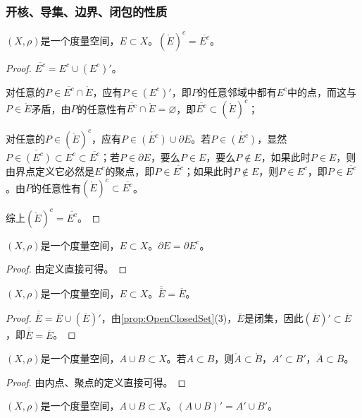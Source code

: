 \subsubsection{开核、导集、边界、闭包的性质}
\begin{theorem}
	$(X,\rho)$是一个度量空间，$E\subset X$。$(\mathring{E})^c=\overline{E^c}$。
\end{theorem}
\begin{proof}
	$\overline{E^c}=E^c\cup (E^c)'$。\par
	对任意的$ P\in\overline{E^c}\cap\mathring{E}$，应有$P\in(E^c)'$，即$P$的任意邻域中都有$E^c$中的点，而这与$P\in\mathring{E}$矛盾，由$P$的任意性有$\overline{E^c}\cap\mathring{E}=\varnothing$，即$\overline{E^c}\subset(\mathring{E})^c$；\par
	对任意的$ P\in(\mathring{E})^c$，应有$P\in\mathring{(E^c)}\cup\partial E$。若$P\in\mathring{(E^c)}$，显然$P\in\mathring{(E^c)}\subset E^c\subset\overline{E^c}$；若$P\in\partial E$，要么$P\in E$，要么$P\notin E$，如果此时$P\in E$，则由界点定义它必然是$E^c$的聚点，即$P\in \overline{E^c}$；如果此时$P\notin E$，则$P\in E^c$，即$P\in \overline{E^c}$。由$P$的任意性有$(\mathring{E})^c\subset\overline{E^c}$。\par
	综上$(\mathring{E})^c=\overline{E^c}$。
\end{proof}
\begin{theorem}
	$(X,\rho)$是一个度量空间，$E\subset X$。$\partial E = \partial E^c$。
\end{theorem}
\begin{proof}
	由定义直接可得。
\end{proof}
\begin{theorem}
	$(X,\rho)$是一个度量空间，$E\subset X$。$\overline{\overline E}=\overline{E}$。
\end{theorem}
\begin{proof}
	$\overline{\overline E}=\overline{E}\cup (\overline{E})'$，由\cref{prop:OpenClosedSet}(3)，$\overline{E}$是闭集，因此$(\overline{E})'\subset\overline{E}$，即$\overline{\overline E}=\overline{E}$。
\end{proof}
\begin{theorem}\label{theo:subsetilc}
	$(X,\rho)$是一个度量空间，$A\cup B\subset X$。若$A\subset B$，则$\mathring{A}\subset\mathring{B}$，$A'\subset B'$，$\overline{A}\subset\overline{B}$。
\end{theorem}
\begin{proof}
	由内点、聚点的定义直接可得。
\end{proof}
\begin{theorem}\label{theo:cuplimitset eq2 limitsetcup}
	$(X,\rho)$是一个度量空间，$A\cup B\subset X$。$(A\cup B)'=A'\cup B'$。
\end{theorem}
